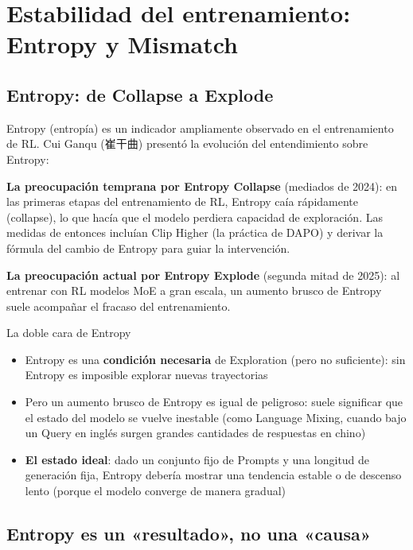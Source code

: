 \section{Estabilidad del entrenamiento: Entropy y Mismatch}

\subsection{Entropy: de Collapse a Explode}

Entropy (entropía) es un indicador ampliamente observado en el entrenamiento de RL. Cui Ganqu (崔干曲) presentó la evolución del entendimiento sobre Entropy:

\textbf{La preocupación temprana por Entropy Collapse} (mediados de 2024): en las primeras etapas del entrenamiento de RL, Entropy caía rápidamente (collapse), lo que hacía que el modelo perdiera capacidad de exploración. Las medidas de entonces incluían Clip Higher (la práctica de DAPO) y derivar la fórmula del cambio de Entropy para guiar la intervención.

\textbf{La preocupación actual por Entropy Explode} (segunda mitad de 2025): al entrenar con RL modelos MoE a gran escala, un aumento brusco de Entropy suele acompañar el fracaso del entrenamiento.

\begin{importantbox}{La doble cara de Entropy}
\begin{itemize}
    \item Entropy es una \textbf{condición necesaria} de Exploration (pero no suficiente): sin Entropy es imposible explorar nuevas trayectorias
    \item Pero un aumento brusco de Entropy es igual de peligroso: suele significar que el estado del modelo se vuelve inestable (como Language Mixing, cuando bajo un Query en inglés surgen grandes cantidades de respuestas en chino)
    \item \textbf{El estado ideal}: dado un conjunto fijo de Prompts y una longitud de generación fija, Entropy debería mostrar una tendencia estable o de descenso lento (porque el modelo converge de manera gradual)
\end{itemize}
\end{importantbox}

\subsection{Entropy es un «resultado», no una «causa»}

